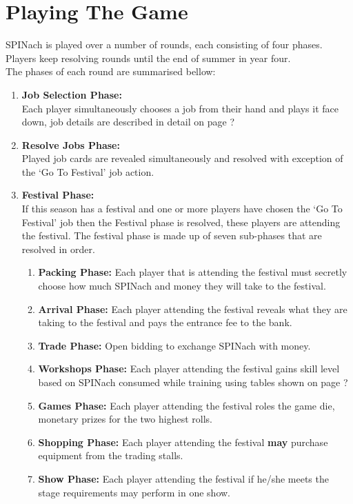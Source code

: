 \chapter{Playing The Game}
SPINach is played over a number of rounds, each consisting of four phases. 
Players keep resolving rounds until the end of summer in year four.
\\
The phases of each round are summarised bellow:
\begin{enumerate}
	\item \textbf{Job Selection Phase:}\hfill \\
	Each player simultaneously chooses a job from their hand and plays it face down, job details are described in detail on page ?
	\item \textbf{Resolve Jobs Phase:} \hfill \\
	Played job cards are revealed simultaneously and resolved with exception of the `Go To Festival' job action.
	\item \textbf{Festival Phase:} \hfill \\
	If this season has a festival and one or more players have chosen the `Go To Festival' job then the Festival phase is resolved, these players are attending the festival. 
	The festival phase is made up of seven sub-phases that are resolved in order.
	\begin{enumerate}[I]
		\item \textbf{Packing Phase:} Each player that is attending the festival must secretly choose how much SPINach and money they will take to the festival.
		\item \textbf{Arrival Phase:} Each player attending the festival reveals what they are taking to the festival and pays the entrance fee to the bank.
		\item \textbf{Trade Phase:} Open bidding to exchange SPINach with money.
		\item \textbf{Workshops Phase:} Each player attending the festival gains skill level based on SPINach consumed while training using tables shown on page ? 
		\item \textbf{Games Phase:} Each player attending the festival roles the game die, monetary prizes for the two highest rolls. 
		\item \textbf{Shopping Phase:} Each player attending the festival \textbf{may} purchase equipment from the trading stalls. 
		\item \textbf{Show Phase:} Each player attending the festival if he/she meets the stage requirements may perform in one show. 

\end{enumerate}
\end{enumerate}

